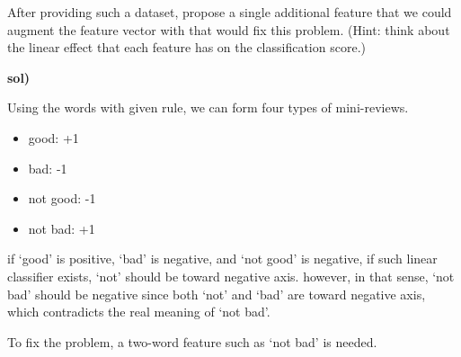 \documentclass[a4paper]{article}
\begin{document}
\begin{enumerate}[label=\alph*.]
        After providing such a dataset, propose a single additional feature that we could augment the feature vector with that would fix this problem.
        (Hint: think about the linear effect that each feature has on the classification score.)

        \medskip \textbf{sol)} 

        Using the words with given rule, we can form four types of mini-reviews.
        \begin{itemize}
            \item good: +1
            \item bad: -1            
            \item not good: -1          
            \item not bad: +1   
        \end{itemize}
        if `good' is positive, `bad' is negative, and `not good' is negative, if such linear classifier exists, `not' should be toward negative axis.
        however, in that sense, `not bad' should be negative since both `not' and `bad' are toward negative axis, which contradicts the real meaning of `not bad'.

        To fix the problem, a two-word feature such as `not bad' is needed.

    \end{enumerate}
\end{document}
